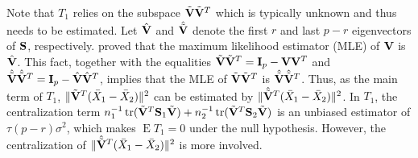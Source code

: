 \documentclass[review]{elsarticle}
\DeclareMathOperator{\mytr}{tr}
\DeclareMathOperator{\myE}{E}
\theoremstyle{plain}
\theoremstyle{definition}
\newtheorem{remark}{\quad\quad Remark}
\theoremstyle{remark}
\begin{document}


Note that $T_1$ %
relies on the subspace $\tilde{\mathbf{V}}\tilde{\mathbf{V}}^T$ which is typically unknown and thus needs to be estimated.
Let $\hat{\mathbf{V}}$ and $\hat{\tilde{\mathbf{V}}}$ denote the first $r$ and last $p-r$ eigenvectors of $\mathbf{S}$, respectively.
\cite{Anderson1986Asymptotic} proved that
the maximum likelihood estimator (MLE) of $\mathbf{V}$ is $\hat{\mathbf{V}}$.
This fact, together with the equalities $\tilde{\mathbf{V}}\tilde{\mathbf{V}}^T= \mathbf{I}_p-\mathbf{V}\mathbf{V}^T$ and $\hat{\tilde{\mathbf{V}}}\hat{\tilde{\mathbf{V}}}^T= \mathbf{I}_p-\hat{\mathbf{V}}\hat{\mathbf{V}}^T$, implies that 
the MLE of $\tilde{\mathbf{V}}\tilde{\mathbf{V}}^T$ is $\hat{\tilde{\mathbf{V}}}\hat{\tilde{\mathbf{V}}}^T$.
Thus, as the main term of $T_1$,
$\|\tilde{\mathbf{V}}^T (\bar{X}_1-\bar{X}_2)\|^2$ can be estimated by $\|\hat{\tilde{\mathbf{V}}}^T (\bar{X}_1-\bar{X}_2)\|^2$.
In $T_1$, the centralization term $n_1^{-1}\mytr(\tilde{\BV}^T \BS_1\tilde{\BV})+n_2^{-1}\mytr(\tilde{\BV}^T \BS_2\tilde{\BV})$ is an unbiased estimator of $\tau (p-r)\sigma^2$, 
which makes $\myE T_1=0$ under the null hypothesis.
However, the centralization of $\|\hat{\tilde{\mathbf{V}}}^T (\bar{X}_1-\bar{X}_2)\|^2$ is more involved.
\end{document}
